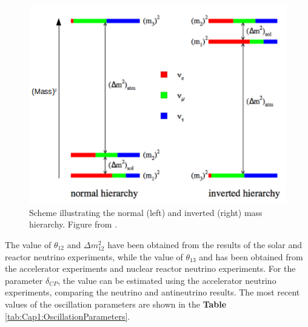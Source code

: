 \begin{figure}[!htb]
    \centering
    \includegraphics[scale=0.4]{Figures/Chapter1/MassHierarchy.png}
    \caption{Scheme illustrating the normal (left) and inverted (right) mass hierarchy. Figure from \cite{AaronThesis}.}
    \label{fig:Cap1:MassHierarchy}
\end{figure}

The value of $\theta_{12}$ and $\Delta m^2_{12}$ have been obtained from the results of the solar and reactor neutrino experiments, while the value of $\theta_{13}$ and has been obtained from the accelerator experiments and nuclear reactor neutrino experiments. For the parameter $\delta_{CP}$, the value can be estimated using the accelerator neutrino experiments, comparing the neutrino and antineutrino results. The most recent values of the oscillation parameters are shown in the \textbf{Table} \ref{tab:Cap1:OscillationParameters}.

